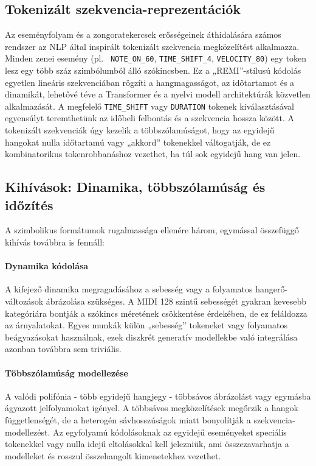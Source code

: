 \subsection{Tokenizált szekvencia-reprezentációk}
Az eseményfolyam és a zongoratekercsek erősségeinek áthidalására számos rendszer az NLP által inspirált tokenizált szekvencia megközelítést alkalmazza.  Minden zenei esemény (pl. \ \texttt{NOTE\_ON\_60}, \texttt{TIME\_SHIFT\_4}, \texttt{VELOCITY\_80}) egy token lesz egy több száz szimbólumból álló szókincsben.  
Ez a „REMI”-stílusú kódolás egyetlen lineáris szekvenciában rögzíti a hangmagasságot, az időtartamot és a dinamikát, lehetővé téve a Transformer és a nyelvi modell architektúrák közvetlen alkalmazását.  A megfelelő \texttt{TIME\_SHIFT} vagy \texttt{DURATION} tokenek kiválasztásával egyensúlyt teremthetünk az időbeli felbontás és a szekvencia hossza között.  
A tokenizált szekvenciák úgy kezelik a többszólamúságot, hogy az egyidejű hangokat nulla időtartamú vagy „akkord” tokenekkel váltogatják, de ez kombinatorikus tokenrobbanáshoz vezethet, ha túl sok egyidejű hang van jelen.

\subsection{Kihívások: Dinamika, többszólamúság és időzítés}
A szimbolikus formátumok rugalmassága ellenére három, egymással összefüggő kihívás továbbra is fennáll:

\paragraph{Dynamika kódolása} A kifejező dinamika megragadásához a sebesség vagy a folyamatos hangerő-változások ábrázolása szükséges.  A MIDI 128 szintű sebességét gyakran kevesebb kategóriára bontják a szókincs méretének csökkentése érdekében, de ez feláldozza az árnyalatokat.  Egyes munkák külön „sebesség” tokeneket vagy folyamatos beágyazásokat használnak, ezek diszkrét generatív modellekbe való integrálása azonban továbbra sem triviális.

\paragraph{Többszólamúság modellezése} A valódi polifónia - több egyidejű hangjegy - többsávos ábrázolást vagy egymásba ágyazott jelfolyamokat igényel.  A többsávos megközelítések megőrzik a hangok függetlenségét, de a heterogén sávhosszúságok miatt bonyolítják a szekvencia-modellezést.  Az egyfolyamú kódolásoknak az egyidejű eseményeket speciális tokenekkel vagy nulla idejű eltolásokkal kell jelezniük, ami összezavarhatja a modelleket és rosszul összehangolt kimenetekhez vezethet.


